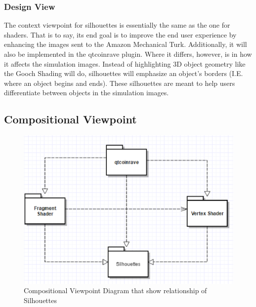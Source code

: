 \documentclass[10pt,journal,compsoc,draftclsnofoot]{IEEEtran}
\begin{document}
\begin{flushleft}
\subsubsection{Design View}
The context viewpoint for silhouettes is essentially the same as the one for shaders.
That is to say, its end goal is to improve the end user experience by enhancing the images sent to the Amazon Mechanical Turk.
Additionally, it will also be implemented in the qtcoinrave plugin.
Where it differs, however, is in how it affects the simulation images.
Instead of highlighting 3D object geometry like the Gooch Shading will do, silhouettes will emphasize an object's borders (I.E. where an object begins and ends).
These silhouettes are meant to help users differentiate between objects in the simulation images.

\subsection{Compositional Viewpoint}

\begin{figure} [H]
  \includegraphics[scale=0.9]{Silhouettes_composition.eps}
  \caption
{ \newline \hspace{\linewidth}
Compositional Viewpoint Diagram that show relationship of Silhouettes}
  \label{fig:Silhouettes_composition}
\end{figure}


\end{flushleft}
\end{document}
